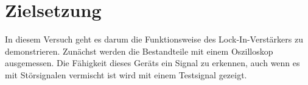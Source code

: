 \section{Zielsetzung}
In diesem Versuch geht es darum die Funktionsweise des Lock-In-Verstärkers zu demonstrieren.
Zunächst werden die Bestandteile mit einem Oszilloskop ausgemessen.
Die Fähigkeit dieses Geräts ein Signal zu erkennen, auch wenn es mit Störsignalen vermischt ist wird mit einem Testsignal gezeigt.